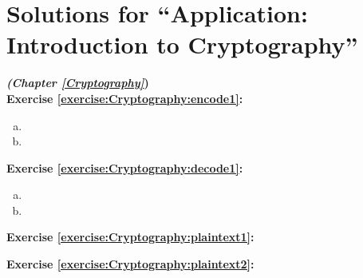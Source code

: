 
\section{Solutions for ``Application: Introduction to Cryptography''}
\noindent\textbf{\textit{ (Chapter \ref{Cryptography}})}\bigskip
\\
\noindent\textbf{Exercise \ref{exercise:Cryptography:encode1}:}
\begin{enumerate}[(a)]
\item
\item
\end{enumerate}

\noindent\textbf{Exercise \ref{exercise:Cryptography:decode1}:}
\begin{enumerate}[(a)]
\item
\item
\end{enumerate}



\noindent\textbf{Exercise \ref{exercise:Cryptography:plaintext1}:}  
%
%

\noindent\textbf{Exercise \ref{exercise:Cryptography:plaintext2}:}
%
%


